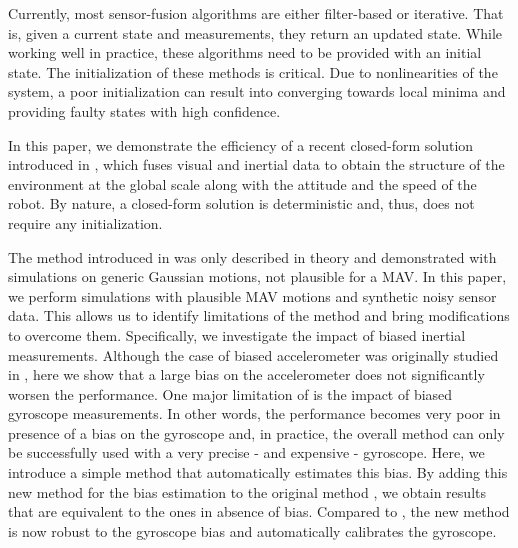 \documentclass[letterpaper, 10 pt, conference]{ieeeconf}  %
\begin{document}
Currently, most sensor-fusion algorithms are either filter-based or iterative. That is, given a current state and measurements, they return an updated state.
While working well in practice, these algorithms need to be provided with an initial state.
The initialization of these methods is critical.
Due to nonlinearities of the system, a poor initialization can result into converging towards local minima and  providing faulty states with high confidence.

In this paper, we demonstrate the efficiency of a recent closed-form solution introduced in \cite{Martinelli2012}\cite{Martinelli2014}, which fuses visual and inertial data to obtain the structure of the environment at the global scale along with the attitude and the speed of the robot.
By nature, a closed-form solution is deterministic and, thus, does not require any initialization.


The method introduced in \cite{Martinelli2012}\cite{Martinelli2014} was only described in theory and demonstrated with simulations on generic Gaussian motions, not plausible for a MAV.
In this paper, we perform simulations with plausible MAV motions and synthetic noisy sensor data.
This allows us to identify limitations of the method and bring modifications to overcome them.
Specifically, we investigate the impact of biased inertial measurements.
Although the case of biased accelerometer was originally studied in \cite{Martinelli2014}, here we show that a large bias on the accelerometer does not significantly worsen the performance.
One major limitation of \cite{Martinelli2014} is the impact of biased gyroscope measurements.
In other words, the performance becomes very poor in presence of a bias on the gyroscope and, in practice, the overall method can only be successfully used with a very precise - and expensive - gyroscope.
Here, we introduce a simple method that automatically estimates this bias. By adding this new method for the bias estimation to the original method \cite{Martinelli2014}, we obtain results that are equivalent to the ones in absence of bias.
Compared to \cite{Martinelli2014}, the new method is now robust to the gyroscope bias and automatically calibrates the gyroscope.
\end{document}
